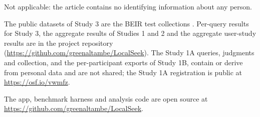 \documentclass[pdflatex,sn-basic,Numbered]{sn-jnl}
\begin{document}
 Not applicable: the article contains no identifying information about any person.

 The public datasets of Study 3 are the BEIR test collections \cite{thakur2021beir}. Per-query results for Study 3, the aggregate results of Studies 1 and 2 and the aggregate user-study results are in the project repository (\url{https://github.com/greenaltambe/LocalSeek}). The Study 1A queries, judgments and collection, and the per-participant exports of Study 1B, contain or derive from personal data and are not shared; the Study 1A registration is public at \url{https://osf.io/vwmfz}.

 The app, benchmark harness and analysis code are open source at \url{https://github.com/greenaltambe/LocalSeek}.


\end{document}
